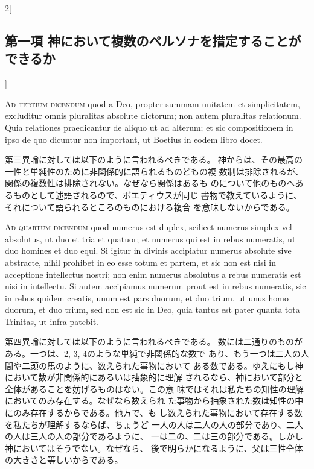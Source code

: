 \documentclass[paper=a4paper,fontsize=10pt,jafontsize=9pt,titlepage]{jlreq}
\begin{document}
\begin{paracol}{2}[\subsection{第一項 神において複数のペルソナを措定することができるか}]
\switchcolumn*[\subsection{ad.3}]


{\scshape Ad tertium dicendum} quod a Deo, propter summam unitatem et
simplicitatem, excluditur omnis pluralitas absolute dictorum; non
autem pluralitas relationum. Quia relationes praedicantur de aliquo ut
ad alterum; et sic compositionem in ipso de quo dicuntur non
important, ut Boetius in eodem libro docet.


\switchcolumn


第三異論に対しては以下のように言われるべきである。
神からは、その最高の一性と単純性のために非関係的に語られるものどもの複
 数制は排除されるが、関係の複数性は排除されない。なぜなら関係はあるも
 のについて他のものへあるものとして述語されるので、ボエティウスが同じ
 書物で教えているように、それについて語られるところのものにおける複合
 を意味しないからである。


\switchcolumn*[\subsection{ad.4}]


{\scshape Ad quartum dicendum} quod numerus est duplex, scilicet numerus simplex
vel absolutus, ut duo et tria et quatuor; et numerus qui est in rebus
numeratis, ut duo homines et duo equi. Si igitur in divinis accipiatur
numerus absolute sive abstracte, nihil prohibet in eo esse totum et
partem, et sic non est nisi in acceptione intellectus nostri; non enim
numerus absolutus a rebus numeratis est nisi in intellectu. Si autem
accipiamus numerum prout est in rebus numeratis, sic in rebus quidem
creatis, unum est pars duorum, et duo trium, ut unus homo duorum, et
duo trium, sed non est sic in Deo, quia tantus est pater quanta tota
Trinitas, ut infra patebit.


\switchcolumn


第四異論に対しては以下のように言われるべきである。
数には二通りのものがある。一つは、2, 3, 4のような単純で非関係的な数で
 あり、もう一つは二人の人間や二頭の馬のように、数えられた事物において
 ある数である。ゆえにもし神において数が非関係的にあるいは抽象的に理解
 されるなら、神において部分と全体があることを妨げるものはない。この意
 味ではそれは私たちの知性の理解においてのみ存在する。なぜなら数えられ
 た事物から抽象された数は知性の中にのみ存在するからである。他方で、も
 し数えられた事物において存在する数を私たちが理解するならば、ちょうど
 一人の人は二人の人の部分であり、二人の人は三人の人の部分であるように、
 一は二の、二は三の部分である。しかし神においてはそうでない。なぜなら、
 後で明らかになるように、父は三性全体の大きさと等しいからである。


\switchcolumn*



\end{paracol}
\newpage
\end{document}

